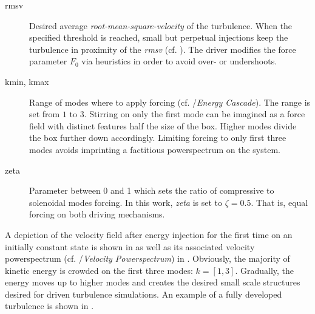 \begin{description}
    \item [rmsv] Desired average \emph{root-mean-square-velocity} of the turbulence. When the
            specified threshold is reached, small but perpetual injections keep the turbulence
            in proximity of the \emph{rmsv} (cf. ). The driver modifies
            the force parameter $F_0$ via heuristics in order to avoid over- or undershoots.
    \item [kmin, kmax] Range of modes where to apply forcing (cf.
        /\emph{Energy Cascade}). The range is set from $1$ to
        $3$. Stirring on only the first mode can be imagined as a force field with
        distinct features half the size of the box. Higher modes divide the box further
        down accordingly. Limiting forcing to only first three modes avoids imprinting
        a factitious powerspectrum on the system.
    \item [zeta] Parameter between 0 and 1 which sets the ratio of
            compressive to solenoidal modes 
            forcing. In this work, \emph{zeta} is set to $\zeta = 0.5$. That is,
            equal forcing on both driving mechanisms.
\end{description}

A depiction of the velocity field after energy injection for the first time on
an initially constant state is shown in
 as well as its associated velocity
powerspectrum (cf. /\emph{Velocity Powerspectrum}) in
.  Obviously, the majority of kinetic energy
is crowded on the first three modes: $k = [1,3]$. Gradually, the energy moves
up to higher modes and creates the desired small scale structures desired for
driven turbulence simulations. An example of a fully developed turbulence
is shown in .
